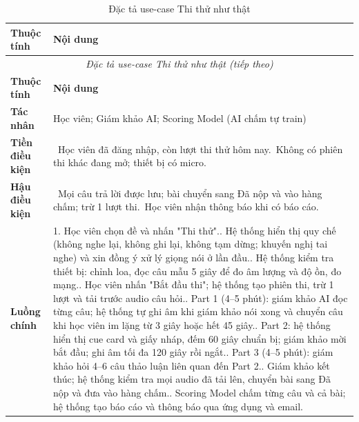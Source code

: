 \begingroup
\small
\renewcommand{\arraystretch}{1.15}
\begin{longtable}{|p{3.2cm}|p{\dimexpr\linewidth-3.2cm-4\tabcolsep-3\arrayrulewidth\relax}|}
\caption{Đặc tả use-case Thi thử như thật}\label{wispace:tab:wispace_uc11_mock_test}\\
\hline
\textbf{Thuộc tính} & \textbf{Nội dung} \\ \hline
\endfirsthead
\multicolumn{2}{c}{\textit{Đặc tả use-case Thi thử như thật (tiếp theo)}}\\
\hline
\textbf{Thuộc tính} & \textbf{Nội dung} \\ \hline
\endhead
\hline
\endfoot
\textbf{Tác nhân} & Học viên; Giám khảo AI; Scoring Model (AI chấm tự train) \\ \hline
\textbf{Tiền điều kiện} & \textbullet{}\ Học viên đã đăng nhập, còn lượt thi thử hôm nay.\newline \textbullet{}\ Không có phiên thi khác đang mở; thiết bị có micro. \\ \hline
\textbf{Hậu điều kiện} & \textbullet{}\ Mọi câu trả lời được lưu; bài chuyển sang Đã nộp và vào hàng chấm; trừ 1 lượt thi.\newline \textbullet{}\ Học viên nhận thông báo khi có báo cáo. \\ \hline
\textbf{Luồng chính} & 1. Học viên chọn đề và nhấn "Thi thử".\newline 2. Hệ thống hiển thị quy chế (không nghe lại, không ghi lại, không tạm dừng; khuyến nghị tai nghe) và xin đồng ý xử lý giọng nói ở lần đầu.\newline 3. Hệ thống kiểm tra thiết bị: chỉnh loa, đọc câu mẫu 5 giây để đo âm lượng và độ ồn, đo mạng.\newline 4. Học viên nhấn "Bắt đầu thi"; hệ thống tạo phiên thi, trừ 1 lượt và tải trước audio câu hỏi.\newline 5. Part 1 (4--5 phút): giám khảo AI đọc từng câu; hệ thống tự ghi âm khi giám khảo nói xong và chuyển câu khi học viên im lặng từ 3 giây hoặc hết 45 giây.\newline 6. Part 2: hệ thống hiển thị cue card và giấy nháp, đếm 60 giây chuẩn bị; giám khảo mời bắt đầu; ghi âm tối đa 120 giây rồi ngắt.\newline 7. Part 3 (4--5 phút): giám khảo hỏi 4--6 câu thảo luận liên quan đến Part 2.\newline 8. Giám khảo kết thúc; hệ thống kiểm tra mọi audio đã tải lên, chuyển bài sang Đã nộp và đưa vào hàng chấm.\newline 9. Scoring Model chấm từng câu và cả bài; hệ thống tạo báo cáo và thông báo qua ứng dụng và email. \\ \hline

\end{longtable}
